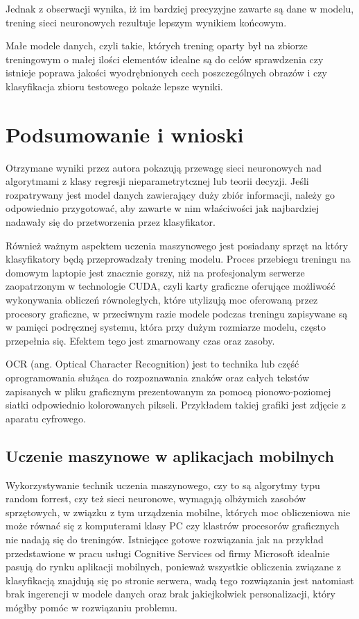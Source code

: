 \documentclass[brudnopis]{xmgr}
\begin{document}
Jednak z obserwacji wynika, iż im bardziej precyzyjne zawarte są dane w modelu, trening sieci neuronowych rezultuje lepszym wynikiem końcowym. 

Małe modele danych, czyli takie, których trening oparty był na zbiorze treningowym o małej ilości elementów idealne są do celów sprawdzenia czy istnieje poprawa jakości wyodrębnionych cech poszczególnych obrazów i czy klasyfikacja zbioru testowego pokaże lepsze wyniki.

\chapter{Podsumowanie i wnioski}

Otrzymane wyniki przez autora pokazują przewagę sieci neuronowych nad algorytmami z klasy regresji nieparametrytcznej lub teorii decyzji. Jeśli rozpatrywany jest model danych zawierający duży zbiór informacji, należy go odpowiednio przygotować, aby zawarte w nim właściwości jak najbardziej nadawały się do przetworzenia przez klasyfikator. 

Również ważnym aspektem uczenia maszynowego jest posiadany sprzęt na który klasyfikatory będą przeprowadzały trening modelu. Proces przebiegu treningu na domowym laptopie jest znacznie gorszy, niż na profesjonalym serwerze zaopatrzonym w technologie CUDA, czyli karty graficzne oferujące możliwość wykonywania obliczeń równoległych, które utylizują moc oferowaną przez procesory graficzne, w przeciwnym razie modele podczas treningu zapisywane są w pamięci podręcznej systemu, która przy dużym rozmiarze modelu, często przepełnia się. Efektem tego jest zmarnowany czas oraz zasoby.

OCR (ang. Optical Character Recognition) jest to technika lub część oprogramowania służąca do rozpoznawania znaków oraz całych tekstów zapisanych w pliku graficznym prezentowanym za pomocą pionowo-poziomej siatki odpowiednio kolorowanych pikseli. Przykładem takiej grafiki jest zdjęcie z aparatu cyfrowego.

\section{Uczenie maszynowe w aplikacjach mobilnych}

Wykorzystywanie technik uczenia maszynowego, czy to są algorytmy typu random forrest, czy też sieci neuronowe, wymagają olbżymich zasobów sprzętowych, w związku z tym urządzenia mobilne, których moc obliczeniowa nie może równać się z komputerami klasy PC czy klastrów procesorów graficznych nie nadają się do treningów. Istniejące gotowe rozwiązania jak na przykład przedstawione w pracu usługi Cognitive Services od firmy Microsoft idealnie pasują do rynku aplikacji mobilnych, ponieważ wszystkie obliczenia związane z klasyfikacją znajdują się po stronie serwera, wadą tego rozwiązania jest natomiast brak ingerencji w modele danych oraz brak jakiejkolwiek personalizacji, który mógłby pomóc w rozwiązaniu problemu.
\end{document}
